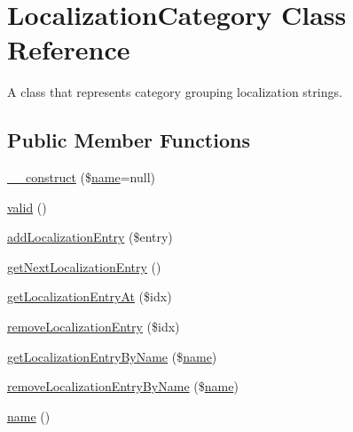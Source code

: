 \hypertarget{class_simple_lion_1_1_localization_category}{\section{Localization\-Category Class Reference}
\label{class_simple_lion_1_1_localization_category}
}


A class that represents category grouping localization strings.  


\subsection*{Public Member Functions}
\begin{DoxyCompactItemize}
\item 
\hyperlink{class_simple_lion_1_1_localization_category_aa7843dae8184afc5ab27814533e12ba8}{\-\_\-\-\_\-construct} (\$\hyperlink{class_simple_lion_1_1_localization_category_a4b516aaa5fa38da4fed24ab6001627e2}{name}=null)
\item 
\hyperlink{class_simple_lion_1_1_localization_category_abb9f0d6adf1eb9b3b55712056861a247}{valid} ()
\item 
\hyperlink{class_simple_lion_1_1_localization_category_a088bc0c650ebd5e60ba88b9edb572ae0}{add\-Localization\-Entry} (\$entry)
\item 
\hyperlink{class_simple_lion_1_1_localization_category_aec06c962021b0422399570806aa60b69}{get\-Next\-Localization\-Entry} ()
\item 
\hyperlink{class_simple_lion_1_1_localization_category_a32a9975a699b2a415f251389c851c82a}{get\-Localization\-Entry\-At} (\$idx)
\item 
\hyperlink{class_simple_lion_1_1_localization_category_a4e001554d3486c0ed72c5fd912541724}{remove\-Localization\-Entry} (\$idx)
\item 
\hyperlink{class_simple_lion_1_1_localization_category_a0897c03f1447505b6b1c9251c90c6ac3}{get\-Localization\-Entry\-By\-Name} (\$\hyperlink{class_simple_lion_1_1_localization_category_a4b516aaa5fa38da4fed24ab6001627e2}{name})
\item 
\hyperlink{class_simple_lion_1_1_localization_category_a2e8695b4ef92eb532964f98a6957594f}{remove\-Localization\-Entry\-By\-Name} (\$\hyperlink{class_simple_lion_1_1_localization_category_a4b516aaa5fa38da4fed24ab6001627e2}{name})
\item 
\hyperlink{class_simple_lion_1_1_localization_category_a4b516aaa5fa38da4fed24ab6001627e2}{name} ()
\item 

\end{DoxyCompactItemize}
